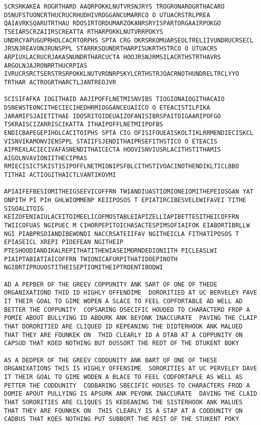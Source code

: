 \documentclass[11pt]{article}
\begin{document}
    \begin{Verbatim}[commandchars=\\\{\}]
SCRSRKAKEA ROGRTHARD AAQRPOKKLNUTVRSNJRYS TROGRONAROGRTHACARO DSNUFSTUONCRTHUCRUCRHUDHIVROGGANCUMARRCO O UTUACRSTRLPREA QAIAVRKSQARUTRTHAU RDOSIRTORDUMARZOKANRSRYISPARTORGAAIRPOKGO TSEIARSCRZAIIRSCREATTA RTHARPOKKLNUTVRRPOKYS UNDRCYAPUGUPRHOLCACRTORPHS SPTA CRG OKRSRKOMUARSEOLTRELIIVUNDRUCRSECL JRSNJREAVONJRUNSPPL STARRKSQUNDRTHARPISUKRTHSTRCO O UTUACRS ARPIUXLACRUCRJAKASNUNDRTHARCUCTA HOOJRSNJRMSILACRTHSTRTHAVRS ARGOLNJAJRONRRTHUCRPIAS IVRUCRSRCTSERSTRSRPOKKLNUTVRONRPSKYLCRTHSTRJOACRNOTHUNDRELTRCLYYO TRTHAR ACTROGRTHARCTLJANTREOJVR 

SCISIFAFKA IOGITHAID AAJIPOFFLNETMISNVIBS TIOGIONAIOGITHACAIO DSNEWSTEONCITHECIECIHEDHRMIOGGANCEUAIICO O ETEACISTILPIKA JARAMIFSJAIETITHAE IDOSRITOIDEUAIZOFANISIBRSPAITOIGAARIPOFGO TSKRAISCIZARRISCIKATTA ITHAIPOFFLNETMIIPOFBS ENDICBAPEGEPIHOLCACITOIPHS SPTA CIG OFISIFOUEAISKOLTIKLRRMENDIECISKCL VISNVIKAMONVIENSPPL STAIIFSJENDITHAIPRSEFITHSTICO O ETEACIS AIPREXLACIECIVAFASNENDITHAICECTA HOOVISNVIUSRLACITHSTITHAMIS AIGOLNVAVIONIITHECIPRAS RMIECISICTSKISTISIPOFFLNETMIONIPSFBLCITHSTIVOACINOTHENDIKLTICLBBO TITHAI ACTIOGITHAICTLVANTIKOVMI 

APIAIFEFBESIOMITHEIGSEEVICOFFRN TWIANDIUASTIOMIONEIOMITHEPEIOSGAN YAT ONPITH PI PIH GHLWIOMMENP KEIIPOSOS T EPIATIRCIBESVELEWIFAVEI TITHE SIGOALITOIG KEIZOFENIAIULACEITOIMEELICOFMOSTABLEIAPIZELLIAPIBETTESITHEICOFFRN TWIICOFUAS NGIPUEC M CIHORPEPITOICHASACTESPIMSOFIAIFOK EIABORTIBRLLW NGI PIABPRSDIANDIBEWONDI NACCRSATEIIFAV NGITHEICLA FITHATIPOSOS T EPIASEICL XREPI PIDEFEAN NGITHEIP PTESHOODIANDIKALREPITHATITHEWIASEIMORNDEDIONIITH PICLEASLWI PIAIPTABIATIAICOFFRN TWIONICAFURPITHATIDOEPINOTH NGIBRTIPRUUOSTITHEISEPTIOMITHEIPTRDENTIBODWI 

AD A PEPBER OF THE GREEV COPPUNITY ANK SART OF ONE OF THEDE ORGANIXATIOND THID ID HIGHLY OFFENDIME  DORORITIED AT UC BERVELEY PAVE IT THEIR GOAL TO GIME WOPEN A SLACE TO FEEL COPFORTABLE AD WELL AD BETTER THE COPPUNITY  COPSARING DSECIFIC HOUDED TO CHARACTERD FROP A POMIE ABOUT BULLYING ID ABDURK ANK BEYONK INACCURATE  PAVING THE CLAIP THAT DORORITIED ARE CLIQUED ID KEPEANING THE DIDTERHOOK ANK MALUED THAT THEY ARE FOUNKEK ON  THID CLEARLY ID A DTAB AT A COPPUNITY ON CAPSUD THAT KOED NOTHING BUT DUSSORT THE REDT OF THE DTUKENT BOKY  

AS A DEDPER OF THE GREEV CODDUNITY ANK BART OF ONE OF THESE ORGANIXATIONS THIS IS HIGHLY OFFENSIME  SORORITIES AT UC PERVELEY DAVE IT THEIR GOAL TO GIME WODEN A BLACE TO FEEL CODFORTAPLE AS WELL AS PETTER THE CODDUNITY  CODBARING SBECIFIC HOUSES TO CHARACTERS FROD A DOMIE APOUT PULLYING IS APSURK ANK PEYONK INACCURATE  DAVING THE CLAID THAT SORORITIES ARE CLIQUES IS KEDEANING THE SISTERHOOK ANK MALUES THAT THEY ARE FOUNKEK ON  THIS CLEARLY IS A STAP AT A CODDUNITY ON CADBUS THAT KOES NOTHING PUT SUBBORT THE REST OF THE STUKENT POKY  


    \end{Verbatim}
\end{document}
